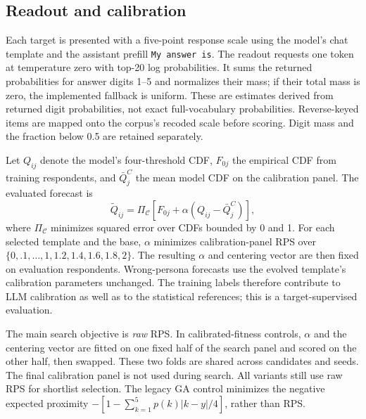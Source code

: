 \documentclass[sigconf,anonymous]{aamas}
\begin{document}
\subsection{Readout and calibration}\label{sec:calibration}
Each target is presented with a five-point response scale using the model's
chat template and the assistant prefill \texttt{My answer is}. The readout
requests one token at temperature zero with top-20 log probabilities. It sums
the returned probabilities for answer digits 1--5 and normalizes their mass;
if their total mass is zero, the implemented fallback is uniform. These are
estimates derived from returned digit probabilities, not exact full-vocabulary
probabilities. Reverse-keyed items are mapped onto the corpus's recoded scale
before scoring. Digit mass and the fraction below 0.5 are retained separately.

Let $Q_{ij}$ denote the model's four-threshold CDF, $F_{0j}$ the empirical
CDF from training respondents, and $\bar Q_j^{C}$ the mean model CDF on the
calibration panel. The evaluated forecast is
\begin{equation}
 \widetilde Q_{ij}=\Pi_{\mathcal C}
 \left[F_{0j}+\alpha\left(Q_{ij}-\bar Q_j^{C}\right)\right],
 \label{eq:calibration}
\end{equation}
where $\Pi_{\mathcal C}$ minimizes squared error over CDFs bounded by 0 and 1.
For each selected template and the base, $\alpha$ minimizes calibration-panel
RPS over $\{0,.1,\ldots,1,1.2,1.4,1.6,1.8,2\}$. The resulting $\alpha$ and
centering vector are then fixed on evaluation respondents. Wrong-persona
forecasts use the evolved template's calibration parameters unchanged.
The training labels therefore contribute to LLM calibration as well as to
the statistical references; this is a target-supervised evaluation.

The main search objective is \emph{raw} RPS. In calibrated-fitness controls,
$\alpha$ and the centering vector are fitted on one fixed half of the search
panel and scored on the other half, then swapped. These two folds are shared
across candidates and seeds. The final calibration panel is not used during
search. All variants still use raw RPS for shortlist selection. The legacy
GA control minimizes the negative expected proximity
$-\left[1-\sum_{k=1}^{5}p(k)|k-y|/4\right]$, rather than RPS.
\end{document}
